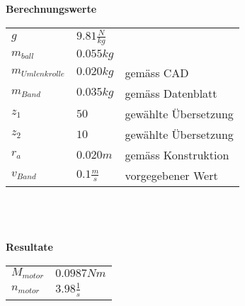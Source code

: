 \textbf{Berechnungswerte}\\
\begin{tabular}{lll}
	\rule{0pt}{11pt} $g$ & $9.81 \frac{N}{kg}$ & \\
	\rule{0pt}{11pt} $m_{ball}$ & $0.055 kg$ & \\
	\rule{0pt}{11pt} $m_{Umlenkrolle}$ & $0.020 kg$ & gemäss CAD \\
	\rule{0pt}{11pt} $m_{Band}$ & $0.035 kg$ & gemäss Datenblatt \\
	\rule{0pt}{11pt} $z_1$ & $50$ & gewählte Übersetzung \\
	\rule{0pt}{11pt} $z_2$ & $10$ & gewählte Übersetzung \\
	\rule{0pt}{11pt} $r_a$ & $0.020 m$ & gemäss Konstruktion \\
	\rule{0pt}{11pt} $v_{Band}$ & $0.1 \frac{m}{s}$ & vorgegebener Wert \\
\end{tabular}\\
\\
\\
\textbf{Resultate}\\
\begin{tabular}{ll}
	\rule{0pt}{11pt} $M_{motor}$ & $0.0987 Nm$ \\
		\rule{0pt}{11pt} $n_{motor}$ & $3.98 \frac{1}{s}$ \\
\end{tabular}